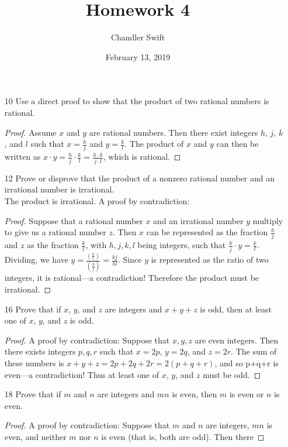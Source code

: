 \documentclass{article}
\title{Homework 4}
\author{Chandler Swift}
\date{February 13, 2019}
\begin{document}
\maketitle
\begin{itemize}
  \item[10] Use a direct proof to show that the product of two rational numbers
    is rational.
    \begin{proof}
      Assume $x$ and $y$ are rational numbers. Then there exist integers
      $h$, $j$, $k$, and $l$ such that $x=\frac{h}{j}$ and $y=\frac{k}{l}$.
      The product of $x$ and $y$ can then be written as
      $x \cdot y = \frac{h}{j} \cdot \frac{k}{l} = \frac{h \cdot k}{j \cdot l}$,
      which is rational.
    \end{proof}
  \item[12] Prove or disprove that the product of a nonzero rational number and
    an irrational number is irrational.\\
    The product is irrational. A proof by contradiction:
    \begin{proof}
      Suppose that a rational number $x$ and an irrational number $y$ multiply
      to give us a rational number $z$. Then $x$ can be represented as the
      fraction $\frac{h}{j}$ and $z$ as the fraction $\frac{k}{l}$, with
      $h,j,k,l$ being integers, such that $\frac{h}{j}\cdot y = \frac{k}{l}$.
      Dividing, we have $y = \frac{(\frac{k}{l})}{(\frac{h}{j})} = \frac{kj}{hl}$.
      Since $y$ is represented as the ratio of two integers, it is rational---a
      contradiction! Therefore the product must be irrational.
    \end{proof}
  \item[16] Prove that if $x$, $y$, and $z$ are integers and $x+y+z$ is odd,
    then at least one of $x$, $y$, and $z$ is odd.
    \begin{proof}
      A proof by contradiction: Suppose that $x, y, z$ are even integers. Then
      there exists integers $p,q,r$ such that $x=2p$, $y=2q$, and $z=2r$. The
      sum of these numbers is $x+y+z=2p+2q+2r=2(p+q+r)$, and so p+q+r is
      even---a contradiction! Thus at least one of $x$, $y$, and $z$ must be
      odd.
    \end{proof}
  \item[18] Prove that if $m$ and $n$ are integers and $mn$ is even, then $m$
    is even or $n$ is even.
    \begin{proof}
      A proof by contradiction: Suppose that $m$ and $n$ are integers, $mn$ is
      even, and neither $m$ nor $n$ is even (that is, both are odd). Then there

\end{proof}
\end{itemize}
\end{document}
